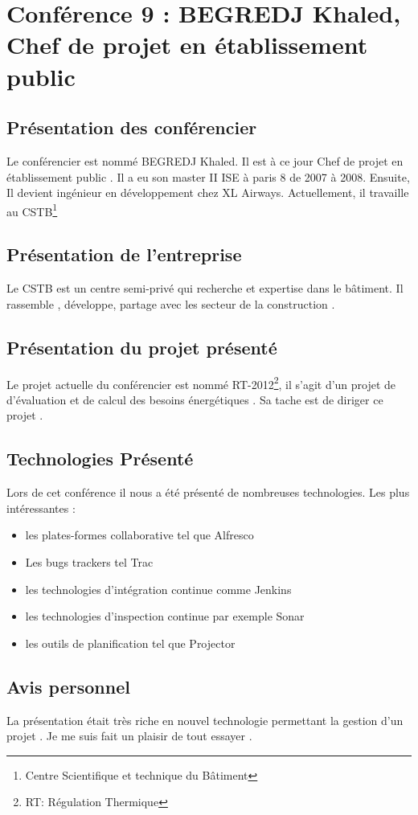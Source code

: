 \section{Conférence 9 : BEGREDJ Khaled, Chef de projet en établissement public}
 	\subsection{Présentation des conférencier}
 		Le conférencier est  nommé BEGREDJ Khaled. Il est à ce jour Chef de projet en établissement public . Il a eu son master II ISE à paris 8 de 2007 à 2008. Ensuite, Il devient ingénieur en développement chez XL Airways. 
 		Actuellement, il travaille au CSTB\footnote{Centre Scientifique et technique du Bâtiment}   
	\subsection{Présentation de l'entreprise}
	Le CSTB est un centre semi-privé qui recherche et expertise dans le bâtiment. Il rassemble , développe, partage avec les secteur de la construction .
	\subsection{Présentation du projet présenté}
	Le projet actuelle du conférencier est nommé RT-2012\footnote{RT: Régulation Thermique}, il s'agit d'un projet de d'évaluation et de calcul des besoins énergétiques . Sa tache est de diriger ce projet .
	\subsection{Technologies Présenté}
	Lors de cet conférence il nous a été présenté de nombreuses technologies. Les plus intéressantes : 
	\begin{itemize}
	 	\item les plates-formes collaborative tel que Alfresco
	 	\item Les bugs trackers tel Trac 
	 	\item les technologies d'intégration continue comme Jenkins
	 	\item les technologies d'inspection continue par exemple Sonar
	 	\item les outils de planification tel que Projector
	 \end{itemize} 
	\subsection{Avis personnel} 
	La présentation était très riche en nouvel technologie permettant la gestion d'un projet . Je me suis fait un plaisir de tout essayer .